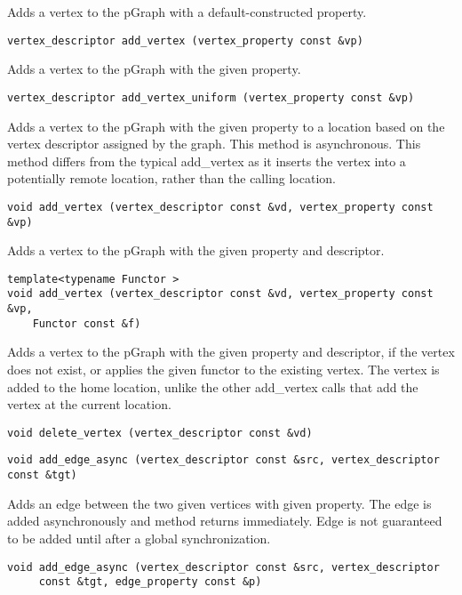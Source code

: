 Adds a vertex to the pGraph with a default-constructed property.

\begin{verbatim}
vertex_descriptor add_vertex (vertex_property const &vp)
\end{verbatim}

Adds a vertex to the pGraph with the given property.

\begin{verbatim}
vertex_descriptor add_vertex_uniform (vertex_property const &vp)
\end{verbatim}

Adds a vertex to the pGraph with the given property to a location based on the vertex descriptor assigned by the graph. This method is asynchronous. This method differs from the typical add\_vertex as it inserts the vertex into a potentially remote location, rather than the calling location.

\begin{verbatim}
void add_vertex (vertex_descriptor const &vd, vertex_property const &vp)
\end{verbatim}

Adds a vertex to the pGraph with the given property and descriptor.

\begin{verbatim}
template<typename Functor >
void add_vertex (vertex_descriptor const &vd, vertex_property const &vp,
    Functor const &f)
\end{verbatim}

Adds a vertex to the pGraph with the given property and descriptor, if the vertex does not exist, or applies the given functor to the existing vertex. The vertex is added to the home location, unlike the other add\_vertex calls that add the vertex at the current location.

\begin{verbatim}
void delete_vertex (vertex_descriptor const &vd)
\end{verbatim}

\begin{verbatim}
void add_edge_async (vertex_descriptor const &src, vertex_descriptor const &tgt)
\end{verbatim}

Adds an edge between the two given vertices with given property. The edge is added asynchronously and method returns immediately. Edge is not guaranteed to be added until after a global synchronization.

\begin{verbatim}
void add_edge_async (vertex_descriptor const &src, vertex_descriptor
     const &tgt, edge_property const &p)
\end{verbatim}

